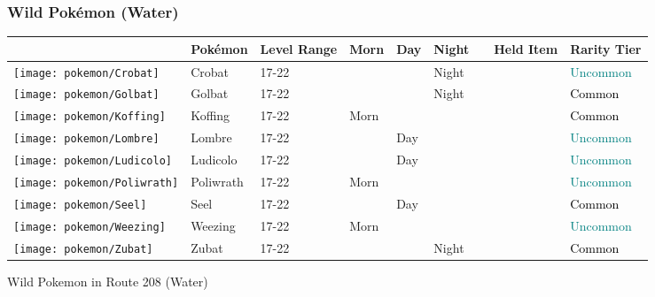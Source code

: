 \subsubsection{Wild Pokémon (Water)}%
\label{ssubsec:WildPokmon(Water)}%
\begin{longtable}{||l l l l l l l l l||}%
\hline%
&Pokémon&Level Range&Morn&Day&Night&&Held Item&Rarity Tier\\%
\hline%
\endhead%
\hline%
\texttt{[image: pokemon/Crobat]}&Crobat&17{-}22&&&Night&&&\textcolor{teal}{%
Uncommon%
}\\%
\hline%
\texttt{[image: pokemon/Golbat]}&Golbat&17{-}22&&&Night&&&\textcolor{black}{%
Common%
}\\%
\hline%
\texttt{[image: pokemon/Koffing]}&Koffing&17{-}22&Morn&&&&&\textcolor{black}{%
Common%
}\\%
\hline%
\texttt{[image: pokemon/Lombre]}&Lombre&17{-}22&&Day&&&&\textcolor{teal}{%
Uncommon%
}\\%
\hline%
\texttt{[image: pokemon/Ludicolo]}&Ludicolo&17{-}22&&Day&&&&\textcolor{teal}{%
Uncommon%
}\\%
\hline%
\texttt{[image: pokemon/Poliwrath]}&Poliwrath&17{-}22&Morn&&&&&\textcolor{teal}{%
Uncommon%
}\\%
\hline%
\texttt{[image: pokemon/Seel]}&Seel&17{-}22&&Day&&&&\textcolor{black}{%
Common%
}\\%
\hline%
\texttt{[image: pokemon/Weezing]}&Weezing&17{-}22&Morn&&&&&\textcolor{teal}{%
Uncommon%
}\\%
\hline%
\texttt{[image: pokemon/Zubat]}&Zubat&17{-}22&&&Night&&&\textcolor{black}{%
Common%
}\\%
\hline%
\end{longtable}%
\caption{Wild Pokemon in Route 208 (Water)}
